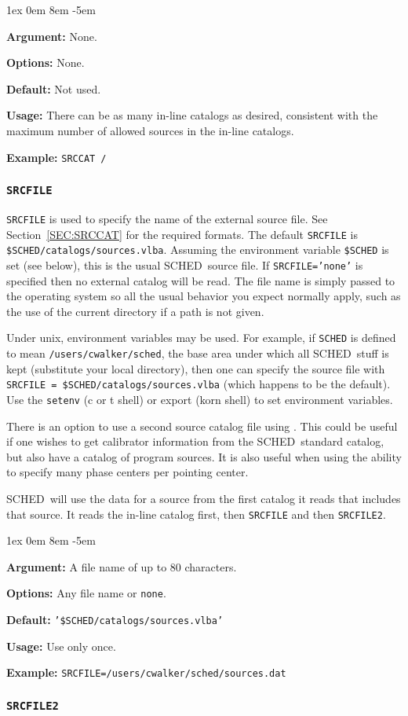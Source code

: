 \documentclass{report}
\newcommand{\schedb}{{\sc SCHED~}}
\newcommand{\rcwbox}[5]{
  \begin{list}{}{\parsep 1ex  \itemsep 0em
                 \leftmargin 8em  \itemindent -5em }
    \item {\bf Argument:} #1
    \item {\bf Options:}  #2
    \item {\bf Default:}  #3
    \item {\bf Usage:}    #4
    \item {\bf Example:}  #5
  \end{list}
}
\begin{document}
\rcwbox
{None.}
{None.}
{Not used.}
{There can be as many in-line catalogs as desired, consistent with
the maximum number of allowed sources in the in-line catalogs.}
{{\tt SRCCAT /}}


\subsubsection{\label{MP:SRCFILE}{\tt SRCFILE}}

{\tt SRCFILE} is used to specify the name of the external source
file. See Section~\ref{SEC:SRCCAT} for the required formats. The
default {\tt SRCFILE} is {\tt \$SCHED/catalogs/sources.vlba}.
Assuming the environment variable {\tt \$SCHED} is set (see below),
this is the usual \schedb source file.  If {\tt SRCFILE='none'} is
specified then no external catalog will be read.  The file name is
simply passed to the operating system so all the usual behavior you
expect normally apply, such as the use of the current directory if a
path is not given.

Under unix, environment variables may be used.  For example, if
{\tt SCHED} is defined to mean {\tt /users/cwalker/sched}, the
base area under which all \schedb stuff is kept (substitute your
local directory), then one can specify the source file with
{\tt SRCFILE = \$SCHED/catalogs/sources.vlba} (which happens to be
the default).  Use the {\tt setenv}
(c or t shell) or export (korn shell) to set environment variables.

There is an option to use a second source catalog file using
.  This could be useful if one
wishes to get calibrator information from the \schedb standard
catalog, but also have a catalog of program sources.  It is also
useful when using the ability to specify many phase centers per
pointing center.

\schedb will use the data for a source from the first catalog it
reads that includes that source.  It reads the in-line catalog first,
then {\tt SRCFILE} and then {\tt SRCFILE2}.

\rcwbox
{A file name of up to 80 characters.}
{Any file name or {\tt none}.}
{{\tt '\$SCHED/catalogs/sources.vlba'}}
{Use only once.}
{{\tt SRCFILE=/users/cwalker/sched/sources.dat}}


\subsubsection{\label{MP:SRCFILE2}{\tt SRCFILE2}}
\end{document}
